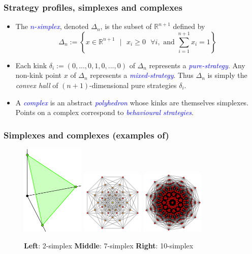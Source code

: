 \documentclass[xcolor=dvipsnames]{beamer}
\begin{document}
\begin{frame}
\frametitle{Strategy profiles, simplexes and complexes}
\begin{definition}
  \begin{itemize}[<+->]
    \item The \textcolor{blue}{$n$-\textit{simplex}}, denoted $\Delta_n$, is the subset of $\mathbb{R}^{n+1}$ defined by
      \begin{equation}
        \Delta_n := \left\{x \in \mathbb{R}^{n+1}\text{ }|\text{ } x_i \ge 0\text{ } \forall i, \text{ and } \sum_{i=1}^{n+1}{x_i} = 1\right\}
      \end{equation}
    \item Each kink $\delta_i := (0, ..., 0,1,0, ...,0)$ of $\Delta_n$ represents a \textit{\textcolor{blue}{pure-strategy}}.
      Any non-kink point $x$ of $\Delta_n$ represents a
      \textit{\textcolor{blue}{mixed-strategy}}. Thus $\Delta_n$ is simply the \textit{convex hall} of $(n+1)$-dimensional pure strategies $\delta_i$.
    \item A \textit{\textcolor{blue}{complex}} is an abstract \textit{\textcolor{blue}{polyhedron}} whose kinks are themselves simplexes. Points on
      a complex correspond to \textit{\textcolor{blue}{behavioural strategies}}.
  \end{itemize}
\end{definition}
\end{frame}

\begin{frame}
\frametitle{Simplexes and complexes (examples of)}
\begin{figure}
  \includegraphics[width=3cm]{simplex.png}
  \includegraphics[width=3cm]{7-simplex.png}
  \includegraphics[width=3cm]{10-simplex.png}
  \caption{\textbf{Left}: 2-simplex \textbf{Middle}: 7-simplex \textbf{Right}: 10-simplex}
\end{figure}
\end{frame}
\end{document}
